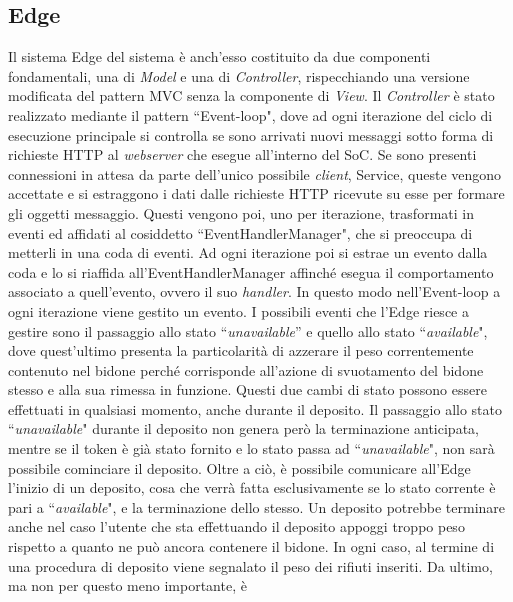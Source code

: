 \documentclass[a4paper, 12pt]{report}
\begin{document}
			\subsection{Edge}
			Il sistema Edge del sistema è anch'esso costituito da due componenti fondamentali, una di
			\textit{Model} e una di \textit{Controller}, rispecchiando una versione modificata del
			pattern MVC senza la componente di \textit{View}.\newline
			Il \textit{Controller} è stato realizzato mediante il pattern ``Event-loop", dove ad ogni iterazione
			del ciclo di esecuzione principale si controlla se sono arrivati nuovi messaggi sotto forma
			di richieste HTTP al \textit{webserver} che esegue all'interno del SoC. Se sono presenti connessioni in attesa
			da parte dell'unico possibile \textit{client}, Service, queste vengono accettate e si
			estraggono i dati dalle richieste HTTP ricevute su esse per formare gli oggetti messaggio. Questi vengono poi, uno per
			iterazione, trasformati in eventi ed affidati al cosiddetto ``EventHandlerManager", 
			che si preoccupa di metterli in una coda di eventi. Ad ogni iterazione poi si estrae un evento dalla coda e lo si
			riaffida all'EventHandlerManager affinché esegua il comportamento associato a
			quell'evento, ovvero il suo \textit{handler}. In questo modo nell'Event-loop a ogni iterazione 
			viene gestito un evento.\newline
			I possibili eventi che
			l'Edge riesce a gestire sono il passaggio allo stato ``\textit{unavailable}'' e quello allo
			stato ``\textit{available}", dove quest'ultimo presenta la particolarità di azzerare il peso
			correntemente contenuto nel bidone perché corrisponde all'azione di svuotamento del bidone
			stesso e alla sua rimessa in funzione. Questi due cambi di stato possono essere effettuati
			in qualsiasi momento, anche durante il deposito. Il passaggio allo stato
			``\textit{unavailable}" durante il deposito non genera però la terminazione anticipata,
			mentre se il token è già stato fornito e lo stato passa ad ``\textit{unavailable}", non sarà
			possibile cominciare il deposito.
			Oltre a ciò, è possibile comunicare all'Edge l'inizio
			di un deposito, cosa che verrà fatta esclusivamente se lo stato corrente è pari a
			``\textit{available}", e la terminazione dello stesso. Un deposito potrebbe terminare anche nel
			caso l'utente che sta effettuando il deposito appoggi troppo peso rispetto a quanto ne può
			ancora contenere il bidone. In ogni caso, al termine di una procedura di deposito viene
			segnalato il peso dei rifiuti inseriti. Da ultimo, ma non per questo meno importante, è
\end{document}
